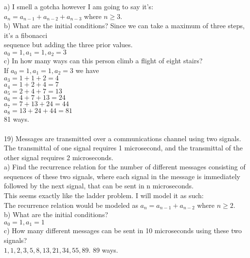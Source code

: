 \documentclass{article}
\begin{document}
\begin{flushleft}
\setlength\parindent{24pt}a) I smell a gotcha however I am going to say it's: \\
\setlength\parindent{24pt} $ a_n = a_{n-1} + a_{n-2} + a_{n-3} $ where $n \geq 3$. \\
\setlength\parindent{24pt}b) What are the initial conditions?  Since we can take a maximum of three steps, it's a fibonacci \\sequence but adding the three prior values. \\ 
$a_0 = 1, a_1 = 1, a_2 = 3$ \\ 
\setlength\parindent{24pt}c) In how many ways can this person climb a flight of eight stairs?  \\
If $a_0 = 1, a_1 = 1, a_2 = 3$ we have \\
$a_3 = 1+1+2 = 4$ \\
$a_4 = 1+2+4 = 7$ \\
$a_5 = 2+4+7 = 13$ \\
$a_6 = 4+7+13 = 24$ \\
$a_7 = 7+13+24 = 44$ \\
$a_8 = 13+24+44 = 81$ \\
81 ways. \\
~\\
\setlength\parindent{0pt}19) Messages are transmitted over a communications channel using two signals.  The transmittal of one signal requires 1 microsecond, and the transmittal of the other signal requires 2 microseconds. \\ 
a) Find the recurrence relation for the number of different messages consisting of sequences of these two signals, where each signal in the message is immediately followed by the next signal, that can be sent in n microseconds. \\ 
\setlength\parindent{24pt}This seems exactly like the ladder problem.  I will model it as such: \\
The recurrence relation would be modeled as $a_n = a_{n-1} + a_{n-2}$ where $n \geq 2$.  \\
\setlength\parindent{24pt}b) What are the initial conditions? \\
\setlength\parindent{24pt}$a_0 = 1, a_1 = 1$ \\
\setlength\parindent{24pt}c) How many different messages can be sent in 10 microseconds using these two signals? \\
\setlength\parindent{24pt} $ 1,1,2,3,5,8,13,21,34,55, 89$.  89 ways.












\end{flushleft}
\end{document}
